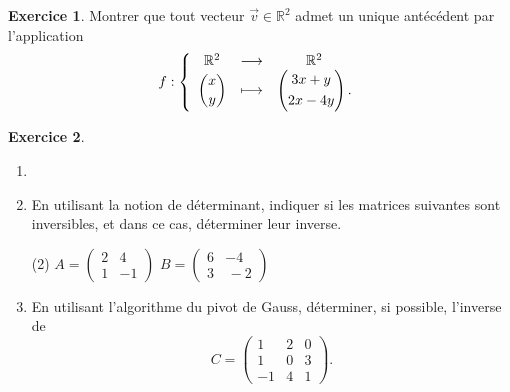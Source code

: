 \documentclass{article}
\theoremstyle{definition}
\newtheorem{exercice}{Exercice}
\begin{document}
\vfill

\begin{exercice}
  Montrer que tout vecteur $\vec v\in\mathbb{R}^2$ admet un unique antécédent par l'application
  \begin{equation*}
    f : \left \{
      \begin{array}{ccc}
        \mathbb{R}^2 &\longrightarrow &\mathbb{R}^2\\
        \dbinom{x}{y} &\longmapsto &
        \begin{pmatrix}
          3x +  y\\[3pt]
          2x - 4y
        \end{pmatrix}.
      \end{array} \right.
  \end{equation*}
\end{exercice}

\vfill

\begin{exercice}
  \begin{enumerate}
    \item[]
    \item En utilisant la notion de déterminant, indiquer si les matrices suivantes sont inversibles, et dans ce cas, déterminer leur inverse.
      \begin{tasks}(2)
        \task[]
        $
        A=
        \begin{pmatrix}2 & 4\\[3pt]1&-1
        \end{pmatrix}
        $
        \task[]
        $
        B=
        \begin{pmatrix}6 & -4\\[3pt]3&\,-2
        \end{pmatrix}
        $
      \end{tasks}
    \item En utilisant l'algorithme du pivot de Gauss, déterminer, si possible, l'inverse de
      \[
        C=
        \begin{pmatrix}
          1 & 2 & 0\\[3pt]
          1 & 0 & 3\\[3pt]
          -1 & 4 & 1
        \end{pmatrix}.
      \]
  \end{enumerate}
\end{exercice}

\newpage
\end{document}

